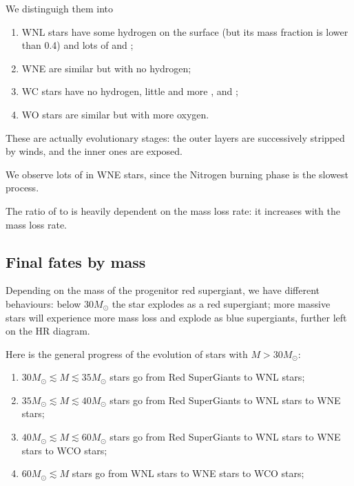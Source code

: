 \documentclass[main.tex]{subfiles}
\begin{document}
We distinguigh them into 
\begin{enumerate}
    \item WNL stars have some hydrogen on the surface (but its mass fraction is lower than \num{.4}) and lots of  and ;
    \item WNE are similar but with no hydrogen;
    \item WC stars have no hydrogen, little  and more ,  and ;
    \item WO stars are similar but with more oxygen.
\end{enumerate}

These are actually evolutionary stages: the outer layers are successively stripped by winds, and the inner ones are exposed.

We observe lots of  in WNE stars, since the Nitrogen burning phase is the slowest process. 

The ratio of  to  is heavily dependent on the mass loss rate: it increases with the mass loss rate.


\subsection{Final fates by mass}

Depending on the mass of the progenitor red supergiant, we have different behaviours: below \(30 M_{\odot} \) the star explodes as a red supergiant; more massive stars will experience more mass loss and explode as blue supergiants, further left on the HR diagram. 

Here is the general progress of the evolution of stars with \(M > 30 M_{\odot}\):
\begin{enumerate}
  \item \(30 M_{\odot} \lesssim M \lesssim 35 M_{\odot}\) stars go from Red SuperGiants to WNL stars;
  \item \(35 M_{\odot} \lesssim M \lesssim 40 M_{\odot}\) stars go from Red SuperGiants to WNL stars to WNE stars;
  \item \(40 M_{\odot} \lesssim M \lesssim 60 M_{\odot}\) stars go from Red SuperGiants to WNL stars to WNE stars to WCO stars;
  \item \(60 M_{\odot} \lesssim M \) stars go from WNL stars to WNE stars to WCO stars;
\end{enumerate}
\end{document}
